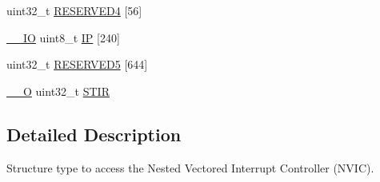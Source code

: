 \begin{DoxyCompactItemize}
\item 
uint32\-\_\-t \hyperlink{structNVIC__Type_a5c0e5d507ac3c1bd5cdaaf9bbd177790}{R\-E\-S\-E\-R\-V\-E\-D4} \mbox{[}56\mbox{]}
\item 
\hyperlink{core__cm3_8h_aec43007d9998a0a0e01faede4133d6be}{\-\_\-\-\_\-\-I\-O} uint8\-\_\-t \hyperlink{structNVIC__Type_a6524789fedb94623822c3e0a47f3d06c}{I\-P} \mbox{[}240\mbox{]}
\item 
uint32\-\_\-t \hyperlink{structNVIC__Type_a4f753b4f824270175af045ac99bc12e8}{R\-E\-S\-E\-R\-V\-E\-D5} \mbox{[}644\mbox{]}
\item 
\hyperlink{core__cm3_8h_a7e25d9380f9ef903923964322e71f2f6}{\-\_\-\-\_\-\-O} uint32\-\_\-t \hyperlink{structNVIC__Type_a0b0d7f3131da89c659a2580249432749}{S\-T\-I\-R}
\end{DoxyCompactItemize}


\subsection{Detailed Description}
Structure type to access the Nested Vectored Interrupt Controller (N\-V\-I\-C). 

